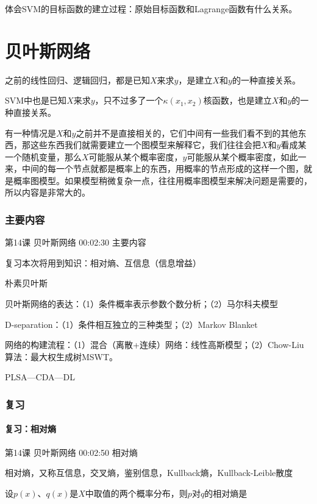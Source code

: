 \documentclass[UTF8]{ctexbook}
\begin{document}
体会SVM的目标函数的建立过程：原始目标函数和Lagrange函数有什么关系。

\chapter{贝叶斯网络}

之前的线性回归、逻辑回归，都是已知$X$来求$y$，是建立$X$和$y$的一种直接关系。

SVM中也是已知$X$来求$y$，只不过多了一个$\kappa(x_{1},x_{2})$核函数，也是建立$X$和$y$的一种直接关系。

有一种情况是$X$和$y$之前并不是直接相关的，它们中间有一些我们看不到的其他东西，那这些东西我们就需要建立一个图模型来解释它，我们往往会把$X$和$y$看成某一个随机变量，那么$X$可能服从某个概率密度，$y$可能服从某个概率密度，如此一来，中间的每一个节点就都是概率上的东西，用概率的节点形成的这样一个图，就是概率图模型。如果模型稍微复杂一点，往往用概率图模型来解决问题是需要的，所以内容是非常大的。

\subsection{主要内容}

第14课 贝叶斯网络 00:02:30 主要内容

复习本次将用到知识：相对熵、互信息（信息增益）

朴素贝叶斯

贝叶斯网络的表达：（1）条件概率表示参数个数分析；（2）马尔科夫模型

D-separation：（1）条件相互独立的三种类型；（2）Markov Blanket

网络的构建流程：（1）混合（离散+连续）网络：线性高斯模型；（2）Chow-Liu算法：最大权生成树MSWT。

PLSA---CDA---DL

\subsection{复习}

\subsubsection{复习：相对熵}

第14课 贝叶斯网络 00:02:50 相对熵

相对熵，又称互信息，交叉熵，鉴别信息，Kullback熵，Kullback-Leible散度

设$p(x)$、$q(x)$是$X$中取值的两个概率分布，则$p$对$q$的相对熵是
\end{document}
